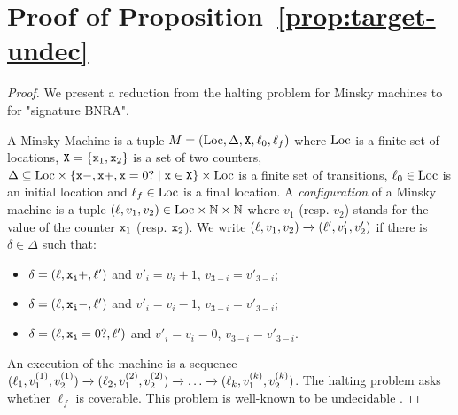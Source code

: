 \section{Proof of Proposition~\ref{prop:target-undec}}
\label{app:target}

\propTargetUndecidable*

\begin{proof}
	We present a reduction from the halting problem for Minsky machines to \COVER for "signature BNRA".
	
	A Minsky Machine is a tuple $M= (\text{Loc}, \Delta, \mathtt{X}, \ell_0, \ell_f)$ where $\text{Loc}$ is a finite set of locations, $\mathtt{X} = \{\mathtt{x}_1, \mathtt{x}_2\}$ is a set of two counters, $\Delta \subseteq \text{Loc} \times \{\mathtt{\mathtt{x}}-,\mathtt{\mathtt{x}}+,\mathtt{\mathtt{x}}=0? \mid \mathtt{x} \in \mathtt{X}\} \times \text{Loc}$ is a finite set of transitions, $\ell_0 \in \text{Loc}$ is an initial location and $\ell_f \in \text{Loc}$ is a final location. A \emph{configuration} of a Minsky machine is a tuple $(\ell, v_1, v_2) \in \text{Loc} \times \mathbb{N} \times \mathbb{N}$ where $v_1$ (resp. $v_2$) stands for the value of the counter $\mathtt{x}_1$ (resp. $\mathtt{x}_2$). 
	We write $(\ell, v_1, v_2) \xrightarrow{} (\ell', v'_1, v'_2)$ if there is $\delta \in \Delta$ such that:
	\begin{itemize}
		\item $\delta = (\ell, \mathtt{\mathtt{x}_i}+, \ell')$ and $v'_i = v_i+1$, $v_{3-i} = v'_{3-i}$;
		\item $\delta = (\ell, \mathtt{\mathtt{x}_i}-, \ell')$ and $v'_i = v_i-1$, $v_{3-i} = v'_{3-i}$;
		\item $\delta = (\ell, \mathtt{\mathtt{x}_i}=0?, \ell')$ and $v'_i = v_i = 0$, $v_{3-i} = v'_{3-i}$.
	\end{itemize}
	An execution of the machine is a sequence $(\ell_1, v_1^{(1)}, v_2^{(1)}) \xrightarrow{} (\ell_2, v_1^{(2)}, v_2^{(2)}) \xrightarrow{} \dots \xrightarrow{} (\ell_k, v_1^{(k)}, v_2^{(k)})$. 
	The halting problem asks whether $\ell_f$ is coverable. This problem is well-known to be undecidable \cite{minsky}.
	

\end{proof}
